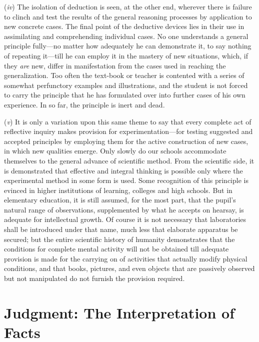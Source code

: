 \documentclass[letterpaper]{book}
\begin{document}

(\emph{iv}) The isolation of deduction is seen, at the other end,
wherever there is failure to clinch and test the results of the general
reasoning processes by application to new concrete cases. The final
point of the deductive devices lies in their use in assimilating and
comprehending individual cases. No one understands a general principle
fully---no matter how adequately he can demonstrate it, to say nothing
of repeating it---till he can employ it in the mastery of new
situations, which, if they \emph{are} new, differ in manifestation from
the cases used in reaching the generalization. Too often the text-book
or teacher is contented with a series of somewhat perfunctory examples
and illustrations, and the student is not forced to carry the principle
that he has formulated over into further cases of his own experience. In
so far, the principle is inert and dead.


(\emph{v}) It is only a variation upon this same theme to say that every
complete act of reflective inquiry makes provision for
experimentation---for testing suggested and accepted principles by
employing them for the active construction of new cases, in which new
qualities emerge. Only slowly do our schools accommodate themselves to
the general advance of scientific method. From the scientific side, it
is demonstrated that effective and integral thinking is possible only
where the
experimental
method in some form is used. Some recognition of this principle is
evinced in higher institutions of learning, colleges and high schools.
But in elementary education, it is still assumed, for the most part,
that the pupil's natural range of observations, supplemented by what he
accepts on hearsay, is adequate for intellectual growth. Of course it is
not necessary that laboratories shall be introduced under that name,
much less that elaborate apparatus be secured; but the entire scientific
history of humanity demonstrates that the conditions for complete mental
activity will not be obtained till adequate provision is made for the
carrying on of activities that actually modify physical conditions, and
that books, pictures, and even objects that are passively observed but
not manipulated do not furnish the provision
required.

\chapter{Judgment: The Interpretation of Facts}
\end{document}
